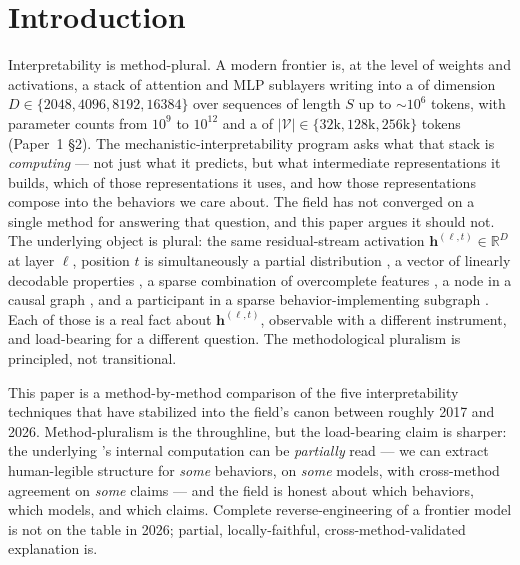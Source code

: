 
\section{Introduction}
\label{sec:introduction}

Interpretability is method-plural. A modern frontier  is, at
the level of weights and activations, a stack of attention and MLP
sublayers writing into a  of dimension $D \in \{2048,
4096, 8192, 16384\}$ over sequences of length $S$ up to $\sim10^6$
tokens, with parameter counts from $10^9$ to $10^{12}$ and a 
of $|\mathcal{V}| \in \{32\text{k}, 128\text{k}, 256\text{k}\}$ tokens
(Paper~1 \S2). The mechanistic-interpretability program asks what that
stack is \emph{computing} --- not just what it predicts, but what
intermediate representations it builds, which of those representations
it uses, and how those representations compose into the behaviors we
care about. The field has not converged on a single method for
answering that question, and this paper argues it should not. The
underlying object is plural: the same residual-stream activation
$\mathbf{h}^{(\ell, t)} \in \mathbb{R}^D$ at layer $\ell$, position
$t$ is simultaneously a partial  distribution
\citep{belrose2023-tuned-lens}, a vector of linearly decodable
properties \citep{marks-tegmark-2023-truth}, a sparse combination of
overcomplete features \citep{gao2024-topk-saes}, a node in a causal
graph \citep{meng2022-rome}, and a participant in a sparse
behavior-implementing subgraph \citep{wang2022-ioi}. Each of those is
a real fact about $\mathbf{h}^{(\ell, t)}$, observable with a
different instrument, and load-bearing for a different question. The
methodological pluralism is principled, not transitional.

This paper is a method-by-method comparison of the five interpretability
techniques that have stabilized into the field's canon between roughly
2017 and 2026. Method-pluralism is the throughline, but the
load-bearing claim is sharper: the underlying 's internal
computation can be \emph{partially} read --- we can extract
human-legible structure for \emph{some} behaviors, on \emph{some}
models, with cross-method agreement on \emph{some} claims --- and the
field is honest about which behaviors, which models, and which claims.
Complete reverse-engineering of a frontier model is not on the table
in 2026; partial, locally-faithful, cross-method-validated explanation
is.

